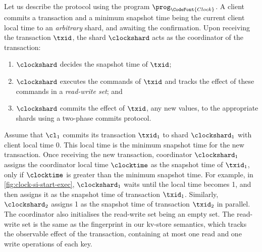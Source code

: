 Let us describe the protocol using the program \( \prog_{\CodeFont{Clock}} \).
A client commits a transaction and a minimum snapshot time being the current client local time
to an \emph{arbitrary} shard, and awaiting the confirmation.
Upon receiving the transaction \( \txid \), the shard \( \clockshard \) acts as the coordinator of the transaction:
\begin{enumerate}
\item \( \clockshard \) decides the snapshot time of \( \txid \);
\item \( \clockshard \) executes the commands of \( \txid \) and tracks the effect of these commands in a \emph{read-write set}; and 
\item \( \clockshard \) commits the effect of \( \txid \), any new values,
    to the appropriate shards using a two-phase commits protocol.
\end{enumerate}

Assume that \( \cl_1 \) commits 
its transaction \( \txid_1\) to shard \( \clockshard_1 \) with client local time \( 0 \).
This local time is the minimum snapshot time for the new transaction.
Once receiving the new transaction,
coordinator \( \clockshard_1 \) assigns the coordinator local time \( \clocktime \) 
as the snapshot time of \( \txid_1 \),
only if \( \clocktime \) is greater than the minimum snapshot time.
For example, in \cref{fig:clock-si-start-exec},
\( \clockshard_1 \) waits until the local time becomes 1,
and then assigns it as the snapshot time of transaction \( \txid_1\).
Similarly, \( \clockshard_2 \) assigns 1 as the snapshot time of transaction \( \txid_2 \) in parallel.
The coordinator also initialises the read-write set being an empty set.
The read-write set is the same as the fingerprint in our kv-store semantics,
which tracks the observable effect of the transaction,
containing at most one read and one write operations of each key.



